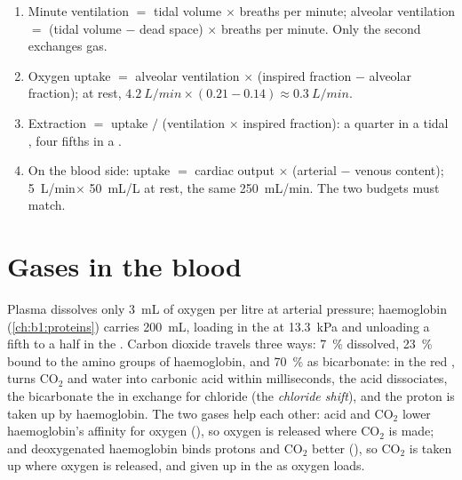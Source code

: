\begin{method}\label{met:b1:gas-exchange:budget}
\begin{enumerate}
  \item Minute ventilation $=$ tidal volume $\times$ breaths per
        minute; alveolar ventilation $=$ (tidal volume $-$ dead space)
        $\times$ breaths per minute. Only the second exchanges gas.
  \item Oxygen uptake $=$ alveolar ventilation $\times$ (inspired
        fraction $-$ alveolar fraction); at rest,
        $\qty{4.2}{L/min}\times(0.21 - 0.14) \approx \qty{0.3}{L/min}$.
  \item Extraction $=$ uptake $/$ (ventilation $\times$ inspired
        fraction): a quarter in a tidal , four fifths in a
         .
  \item On the blood side: uptake $=$ cardiac output $\times$
        (arterial $-$ venous content); \qty{5}{L/min}$\times$
        \qty{50}{mL/L} at rest, the same \qty{250}{mL/min}. The two
        budgets must match.
\end{enumerate}
\end{method}

\section{Gases in the blood}

\begin{proposition}\label{prop:b1:gas-exchange:transport}
Plasma dissolves only \qty{3}{mL} of oxygen per litre at arterial
pressure; haemoglobin (\cref{ch:b1:proteins}) carries \qty{200}{mL},
loading in the  at \qty{13.3}{kPa} and unloading a fifth to a
half in the . Carbon dioxide travels three ways: \qty{7}{\%}
dissolved, \qty{23}{\%} bound to the amino groups of haemoglobin, and
\qty{70}{\%} as bicarbonate: in the red , \emph{} turns $\mathrm{CO_2}$ and water into carbonic acid within
milliseconds, the acid dissociates, the bicarbonate  the  in
exchange for chloride (the \emph{chloride shift}), and the proton is
taken up by haemoglobin. The two gases help each other: acid and
$\mathrm{CO_2}$ lower haemoglobin's affinity for oxygen (\emph{}), so oxygen is released where $\mathrm{CO_2}$ is made; and
deoxygenated haemoglobin binds protons and $\mathrm{CO_2}$ better
(\emph{}), so $\mathrm{CO_2}$ is taken up where oxygen is
released, and given up in the  as oxygen loads.
\end{proposition}

